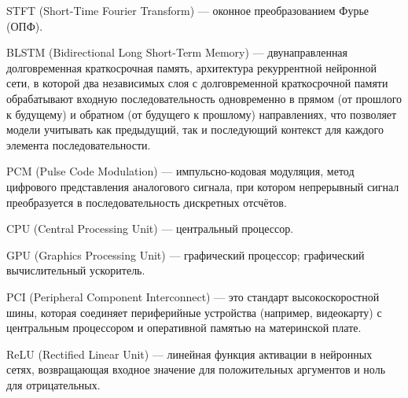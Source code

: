\documentclass[14pt]{extarticle}
\begin{document}
\par STFT (Short-Time Fourier Transform) --- оконное преобразованием Фурье (ОПФ).
\par BLSTM (Bidirectional Long Short-Term Memory) --- двунаправленная долговременная краткосрочная память, архитектура рекуррентной нейронной сети, в которой два независимых слоя с долговременной краткосрочной памяти обрабатывают входную последовательность одновременно в прямом (от прошлого к будущему) и обратном (от будущего к прошлому) направлениях, что позволяет модели учитывать как предыдущий, так и последующий контекст для каждого элемента последовательности.
\par PCM (Pulse Code Modulation) --- импульсно-кодовая модуляция, метод цифрового представления аналогового сигнала, при котором непрерывный сигнал преобразуется в последовательность дискретных отсчётов.
\par CPU (Central Processing Unit) --- центральный процессор.
\par GPU (Graphics Processing Unit) --- графический процессор; графический вычислительный ускоритель.
\par PCI (Peripheral Component Interconnect) --- это стандарт высокоскоростной шины, которая соединяет периферийные устройства (например, видеокарту) с центральным процессором и оперативной памятью на материнской плате.
\par ReLU (Rectified Linear Unit) --- линейная функция активации в нейронных сетях, возвращающая входное значение для положительных аргументов и ноль для отрицательных.
%

\renewcommand{\contentsname}{\rucontentsname}
\tableofcontents

\end{document}
